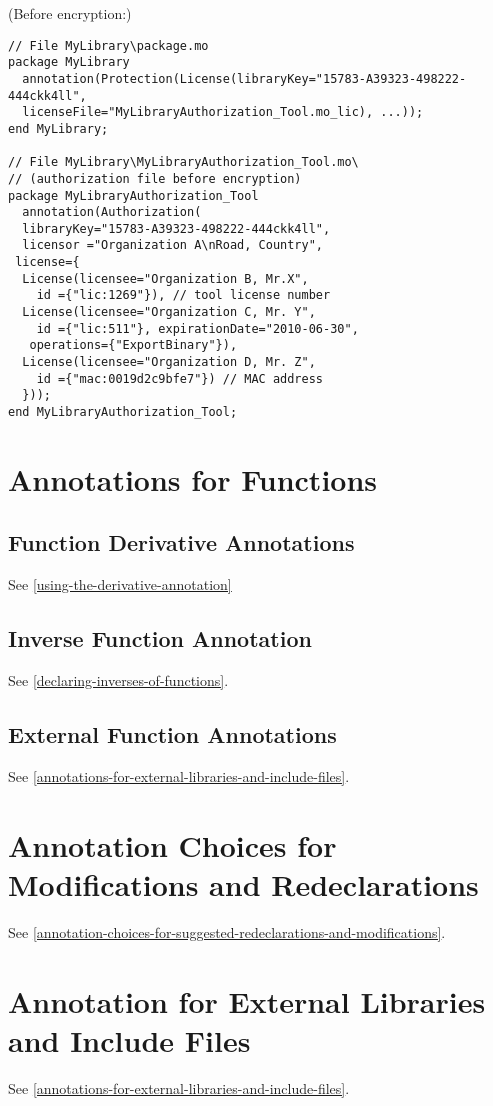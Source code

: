 \begin{example}
(Before encryption:)
\begin{lstlisting}[language=modelica]
// File MyLibrary\package.mo
package MyLibrary
  annotation(Protection(License(libraryKey="15783-A39323-498222-444ckk4ll",
  licenseFile="MyLibraryAuthorization_Tool.mo_lic), ...));
end MyLibrary;

// File MyLibrary\MyLibraryAuthorization_Tool.mo\
// (authorization file before encryption)
package MyLibraryAuthorization_Tool
  annotation(Authorization(
  libraryKey="15783-A39323-498222-444ckk4ll",
  licensor ="Organization A\nRoad, Country",
 license={
  License(licensee="Organization B, Mr.X",
    id ={"lic:1269"}), // tool license number
  License(licensee="Organization C, Mr. Y",
    id ={"lic:511"}, expirationDate="2010-06-30",
   operations={"ExportBinary"}),
  License(licensee="Organization D, Mr. Z",
    id ={"mac:0019d2c9bfe7"}) // MAC address
  }));
end MyLibraryAuthorization_Tool;
\end{lstlisting}
\end{example}

\section{Annotations for Functions}\label{annotations-for-functions}

\subsection{Function Derivative Annotations}\label{function-derivative-annotations}

See \cref{using-the-derivative-annotation}

\subsection{Inverse Function Annotation}\label{inverse-function-annotation}

See \cref{declaring-inverses-of-functions}.

\subsection{External Function Annotations}\label{external-function-annotations}

See \cref{annotations-for-external-libraries-and-include-files}.

\section{Annotation Choices for Modifications and Redeclarations}\label{annotation-choices-for-modifications-and-redeclarations}

See \cref{annotation-choices-for-suggested-redeclarations-and-modifications}.

\section{Annotation for External Libraries and Include Files}\label{annotation-for-external-libraries-and-include-files}

See \cref{annotations-for-external-libraries-and-include-files}.
